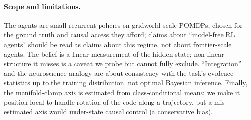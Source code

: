 \documentclass[11pt]{article}
\begin{document}
\paragraph{Scope and limitations.} The agents are small recurrent policies on
gridworld-scale POMDPs, chosen for the ground truth and causal access they afford;
claims about ``model-free RL agents'' should be read as claims about this regime,
not about frontier-scale agents. The belief is a linear measurement of the hidden
state; non-linear structure it misses is a caveat we probe but cannot fully exclude.
``Integration'' and the neuroscience analogy are about consistency with the task's
evidence statistics up to the training distribution, not optimal Bayesian inference.
Finally, the manifold-clamp axis is estimated from class-conditional means; we make
it position-local to handle rotation of the code along a trajectory, but a
mis-estimated axis would under-state causal control (a conservative bias).
\end{document}
